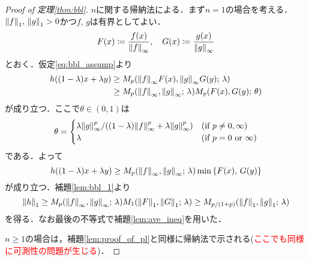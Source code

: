 \documentclass[a4j]{ltjsarticle}
\newcommand{\1}{\bm{1}}
\newcommand{\M}[4]{M_{#1}\qty(#2,#3;\,#4)}
\numberwithin{equation}{section}
\theoremstyle{definition}
\begin{document}
\begin{proof}[Proof of \textup{定理\ref{thm:bbl}}]
    $n$に関する帰納法による．まず$n=1$の場合を考える．$\norm{f}_1,\,\norm{g}_1>0$かつ$f,\,g$は有界としてよい．
    \begin{equation}
        F(x)\coloneqq \frac{f(x)}{\norm{f}_{\infty}},\quad G(x)\coloneqq \frac{g(x)}{\norm{g}_{\infty}}
    \end{equation}
    とおく．仮定\eqref{eq:bbl_assump}より
    \begin{align}
        h((1-\lambda)x+\lambda y)&\geq \M{p}{\norm{f}_{\infty}F(x)}{\norm{g}_{\infty}G(y)}{\lambda}\\
        &\geq \M{p}{\norm{f}_{\infty}}{\norm{g}_{\infty}}{\lambda}\M{p}{F(x)}{G(y)}{\theta}
    \end{align}
    が成り立つ．ここで$\theta\in(0,1)$は
    \begin{equation}
        \theta=\begin{cases}
            \lambda\norm{g}_{\infty}^p/((1-\lambda)\norm{f}_{\infty}^p+\lambda \norm{g}_{\infty}^p) & (\text{if $p\neq 0,\infty$})\\
            \lambda & (\text{if $p=0$ or $\infty$})
        \end{cases}
    \end{equation}
    である．よって
    \begin{equation}
        h((1-\lambda)x+\lambda y)\geq \M{p}{\norm{f}_{\infty}}{\norm{g}_{\infty}}{\lambda}\min\qty{F(x),\,G(y)}
    \end{equation}
    が成り立つ．補題\ref{lem:bbl_1}より
    \begin{equation}
        \norm{h}_{1}\geq \M{p}{\norm{f}_{\infty}}{\norm{g}_{\infty}}{\lambda}\M{1}{\norm{F}_{1}}{\norm{G}_1}{\lambda}\geq \M{p/(1+p)}{\norm{f}_{1}}{\norm{g}_{1}}{\lambda} 
    \end{equation}
    を得る．なお最後の不等式で補題\ref{lem:ave_ineq}を用いた．

    $n\geq 1$の場合は，補題\ref{lem:proof_of_pl}と同様に帰納法で示される(\textcolor{red}{ここでも同様に可測性の問題が生じる})．
\end{proof}
\end{document}
